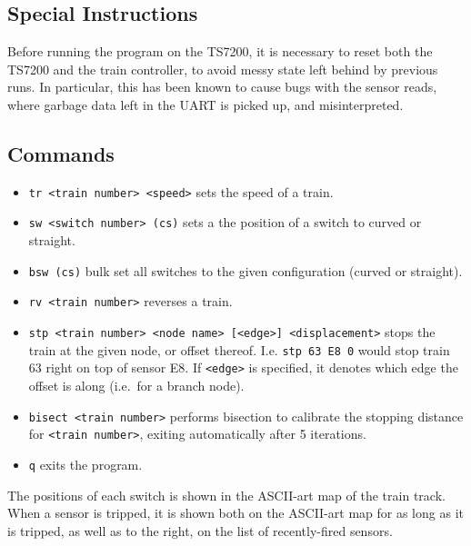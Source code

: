 \subsection{Special Instructions}\label{special-instructions}

Before running the program on the TS7200, it is necessary to reset both
the TS7200 and the train controller, to avoid messy state left behind by
previous runs. In particular, this has been known to cause bugs with the
sensor reads, where garbage data left in the UART is picked up, and
misinterpreted.

\subsection{Commands}\label{commands}

\begin{itemize}
\itemsep1pt\parskip0pt
\item
  \texttt{tr \textless{}train number\textgreater{} \textless{}speed\textgreater{}}
  sets the speed of a train.
\item
  \texttt{sw \textless{}switch number\textgreater{} (c\textbar{}s)} sets
  a the position of a switch to curved or straight.
\item
  \texttt{bsw (c\textbar{}s)} bulk set all switches to the given
  configuration (curved or straight).
\item
  \texttt{rv \textless{}train number\textgreater{}} reverses a train.
\item
  \texttt{stp \textless{}train number\textgreater{} \textless{}node name\textgreater{} {[}\textless{}edge\textgreater{}{]} \textless{}displacement\textgreater{}}
  stops the train at the given node, or offset thereof. I.e.
  \texttt{stp 63 E8 0} would stop train 63 right on top of sensor E8. If
  \texttt{\textless{}edge\textgreater{}} is specified, it denotes which
  edge the offset is along (i.e.~for a branch node).
\item
  \texttt{bisect \textless{}train number\textgreater{}} performs
  bisection to calibrate the stopping distance for
  \texttt{\textless{}train number\textgreater{}}, exiting automatically
  after 5 iterations.
\item
  \texttt{q} exits the program.
\end{itemize}

The positions of each switch is shown in the ASCII-art map of the train
track. When a sensor is tripped, it is shown both on the ASCII-art map
for as long as it is tripped, as well as to the right, on the list of
recently-fired sensors.
